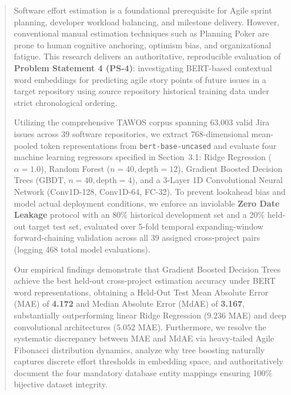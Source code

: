 \documentclass[11pt,a4paper]{article}
\begin{document}
\begin{abstract}
\noindent Software effort estimation is a foundational prerequisite for Agile sprint planning, developer workload balancing, and milestone delivery. However, conventional manual estimation techniques such as Planning Poker are prone to human cognitive anchoring, optimism bias, and organizational fatigue. This research delivers an authoritative, reproducible evaluation of \textbf{Problem Statement 4 (PS-4)}: investigating BERT-based contextual word embeddings for predicting agile story points of future issues in a target repository using source repository historical training data under strict chronological ordering.

Utilizing the comprehensive TAWOS corpus spanning 63,003 valid Jira issues across 39 software repositories, we extract 768-dimensional mean-pooled token representations from \texttt{bert-base-uncased} and evaluate four machine learning regressors specified in Section~3.1: Ridge Regression ($\alpha=1.0$), Random Forest ($n=40, \text{depth}=12$), Gradient Boosted Decision Trees (GBDT, $n=40, \text{depth}=4$), and a 3-Layer 1D Convolutional Neural Network (Conv1D-128, Conv1D-64, FC-32). To prevent lookahead bias and model actual deployment conditions, we enforce an inviolable \textbf{Zero Date Leakage} protocol with an 80\% historical development set and a 20\% held-out target test set, evaluated over 5-fold temporal expanding-window forward-chaining validation across all 39 assigned cross-project pairs (logging 468 total model evaluations).

Our empirical findings demonstrate that Gradient Boosted Decision Trees achieve the best held-out cross-project estimation accuracy under BERT word representations, obtaining a Held-Out Test Mean Absolute Error (MAE) of \textbf{4.172} and Median Absolute Error (MdAE) of \textbf{3.167}, substantially outperforming linear Ridge Regression ($9.236$ MAE) and deep convolutional architectures ($5.052$ MAE). Furthermore, we resolve the systematic discrepancy between MAE and MdAE via heavy-tailed Agile Fibonacci distribution dynamics, analyze why tree boosting naturally captures discrete effort thresholds in embedding space, and authoritatively document the four mandatory database entity mappings ensuring 100\% bijective dataset integrity.
\end{abstract}
\end{document}
